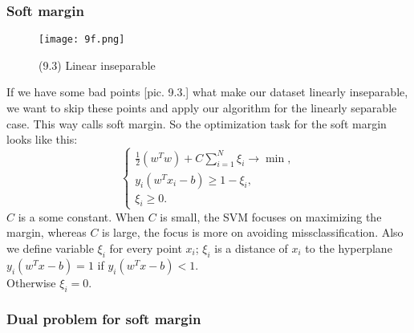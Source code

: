\subsubsection*{Soft margin}

\begin{wrapfigure}{r}{0.33\linewidth}
  \vspace{-1.4cm}
  \begin{center}
    \texttt{[image: 9f.png]}
  \end{center}
  \vspace{-0.8cm}
  \caption*{(9.3) Linear inseparable}
  \vspace{-2cm}
\end{wrapfigure}
If we have some bad points [pic. 9.3.] what make our dataset linearly inseparable, we want to skip these points and apply our algorithm for the linearly separable case. This way calls soft margin. So the optimization task for the soft margin looks like this:
$$\begin{cases}
	\frac{1}{2}(w^Tw)+C\sum\limits_{i=1}^{N}\xi_i\to\min, \\
	y_i(w^Tx_i-b)\ge1-\xi_i, \\
	\xi_i\ge0.
\end{cases}$$
$C$ is a some constant. When $C$ is small, the SVM focuses on maximizing the margin, whereas $C$ is large, the focus is more on avoiding missclassification. Also we define variable $\xi_i$ for every point $x_i$; $\xi_i$ is a distance of $x_i$ to the hyperplane $y_i(w^Tx-b)=1$ if $y_i(w^Tx-b)<1$.\\
Otherwise $\xi_i=0$.

\subsubsection*{Dual problem for soft margin}

